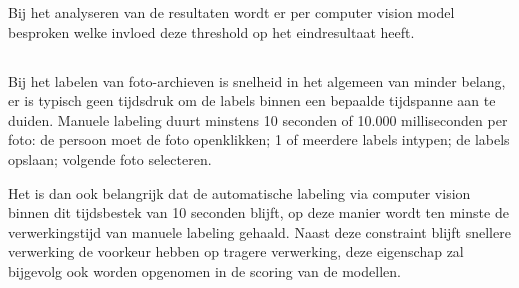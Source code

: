 Bij het analyseren van de resultaten wordt er per computer vision model besproken welke invloed deze threshold op het eindresultaat heeft. 

\subsection{}
\label{sec:scoren-of-speed}
Bij het labelen van foto-archieven is snelheid in het algemeen van minder belang, er is typisch geen tijdsdruk om de labels binnen een bepaalde tijdspanne aan te duiden. Manuele labeling duurt minstens 10 seconden of 10.000 milliseconden per foto: de persoon moet de foto openklikken; 1 of meerdere labels intypen; de labels opslaan; volgende foto selecteren. 

Het is dan ook belangrijk dat de automatische labeling via computer vision binnen dit tijdsbestek van 10 seconden blijft, op deze manier wordt ten minste de verwerkingstijd van manuele labeling gehaald. Naast deze constraint blijft snellere verwerking de voorkeur hebben op tragere verwerking, deze eigenschap zal bijgevolg ook worden opgenomen in de scoring van de modellen.
